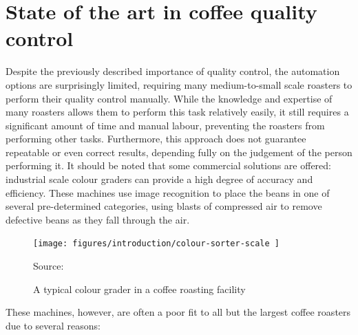 \section{State of the art in coffee quality control}
\label{sec:qc-state-of-the-art} Despite the previously described importance of quality
control, the automation options are surprisingly limited, requiring many medium-to-small
scale roasters to perform their quality control manually. While the knowledge
and expertise of many roasters allows them to perform this task relatively
easily, it still requires a significant amount of time and manual labour,
preventing the roasters from performing other tasks. Furthermore, this approach
does not guarantee repeatable or even correct results, depending fully on the judgement
of the person performing it.
\pagebreak
It should be noted that some commercial solutions are offered: industrial scale colour
graders can provide a high degree of accuracy and efficiency. These machines use
image recognition to place the beans in one of several pre-determined categories,
using blasts of compressed air to remove defective beans as they fall through the
air.
\begin{figure}
	\texttt{[image: 
		figures/introduction/colour-sorter-scale
	]}
	\caption{*}
	{Source: \cite{colourSorterImg}}
	\caption{A typical colour grader in a coffee roasting facility}
	\label{fig:colourSorterExample}
	\vspace{-3em}
\end{figure}
These machines, however, are often a poor fit to all but the largest coffee
roasters due to several reasons:
